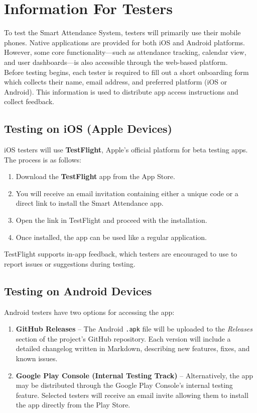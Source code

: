 \documentclass[a4paper, 12pt]{article}
\begin{document}
  \section{Information For Testers}
    To test the Smart Attendance System, testers will primarily use their mobile phones. Native applications are provided for both iOS and Android platforms. However, some core functionality—such as attendance tracking, calendar view, and user dashboards—is also accessible through the web-based platform. \\

    Before testing begins, each tester is required to fill out a short onboarding form which collects their name, email address, and preferred platform (iOS or Android). This information is used to distribute app access instructions and collect feedback.

  \subsection{Testing on iOS (Apple Devices)}

    iOS testers will use \textbf{TestFlight}, Apple’s official platform for beta testing apps. The process is as follows:

    \begin{enumerate}
      \item Download the \textbf{TestFlight} app from the App Store.
      \item You will receive an email invitation containing either a unique code or a direct link to install the Smart Attendance app.
      \item Open the link in TestFlight and proceed with the installation.
      \item Once installed, the app can be used like a regular application.
    \end{enumerate}

    TestFlight supports in-app feedback, which testers are encouraged to use to report issues or suggestions during testing.

  \subsection{Testing on Android Devices}

    Android testers have two options for accessing the app:

    \begin{enumerate}
      \item \textbf{GitHub Releases} – The Android \texttt{.apk} file will be uploaded to the \emph{Releases} section of the project's GitHub repository. Each version will include a detailed changelog written in Markdown, describing new features, fixes, and known issues.
      \item \textbf{Google Play Console (Internal Testing Track)} – Alternatively, the app may be distributed through the Google Play Console's internal testing feature. Selected testers will receive an email invite allowing them to install the app directly from the Play Store.
    \end{enumerate}
\end{document}
